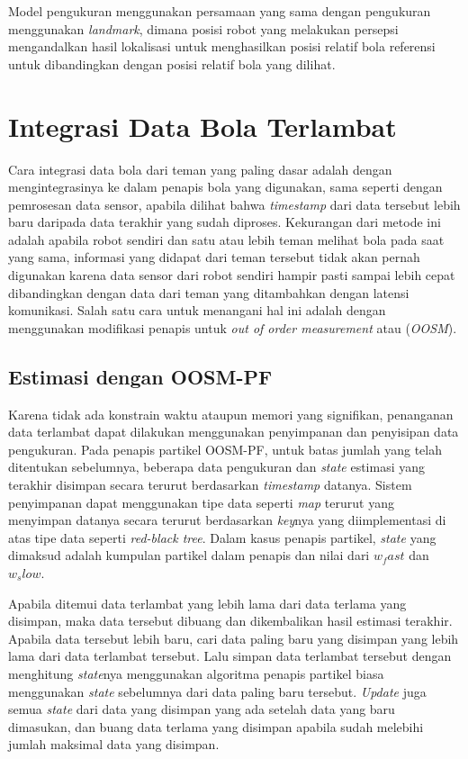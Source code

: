 Model pengukuran menggunakan persamaan yang sama dengan pengukuran menggunakan \textit{landmark}, dimana posisi robot yang melakukan persepsi mengandalkan hasil lokalisasi untuk menghasilkan posisi relatif bola referensi untuk dibandingkan dengan posisi relatif bola yang dilihat.

\section{Integrasi Data Bola Terlambat}

Cara integrasi data bola dari teman yang paling dasar adalah dengan mengintegrasinya ke dalam penapis bola yang digunakan, sama seperti dengan pemrosesan data sensor, apabila dilihat bahwa \textit{timestamp} dari data tersebut lebih baru daripada data terakhir yang sudah diproses. Kekurangan dari metode ini adalah apabila robot sendiri dan satu atau lebih teman melihat bola pada saat yang sama, informasi yang didapat dari teman tersebut tidak akan pernah digunakan karena data sensor dari robot sendiri hampir pasti sampai lebih cepat dibandingkan dengan data dari teman yang ditambahkan dengan latensi komunikasi. Salah satu cara untuk menangani hal ini adalah dengan menggunakan modifikasi penapis untuk \textit{out of order measurement} atau (\textit{OOSM}).

\subsection{Estimasi dengan OOSM-PF}

Karena tidak ada konstrain waktu ataupun memori yang signifikan, penanganan data terlambat dapat dilakukan menggunakan penyimpanan dan penyisipan data pengukuran. Pada penapis partikel OOSM-PF, untuk batas jumlah yang telah ditentukan sebelumnya, beberapa data pengukuran dan \textit{state} estimasi yang terakhir disimpan secara terurut berdasarkan \textit{timestamp} datanya. Sistem penyimpanan dapat menggunakan tipe data seperti \textit{map} terurut yang menyimpan datanya secara terurut berdasarkan \textit{key}nya yang diimplementasi di atas tipe data seperti \textit{red-black tree}. Dalam kasus penapis partikel, \textit{state} yang dimaksud adalah kumpulan partikel dalam penapis dan nilai dari $w_fast$ dan $w_slow$.

Apabila ditemui data terlambat yang lebih lama dari data terlama yang disimpan, maka data tersebut dibuang dan dikembalikan hasil estimasi terakhir. Apabila data tersebut lebih baru, cari data paling baru yang disimpan yang lebih lama dari data terlambat tersebut. Lalu simpan data terlambat tersebut dengan menghitung \textit{state}nya menggunakan algoritma penapis partikel biasa menggunakan \textit{state} sebelumnya dari data paling baru tersebut. \textit{Update} juga semua \textit{state} dari data yang disimpan yang ada setelah data yang baru dimasukan, dan buang data terlama yang disimpan apabila sudah melebihi jumlah maksimal data yang disimpan.

